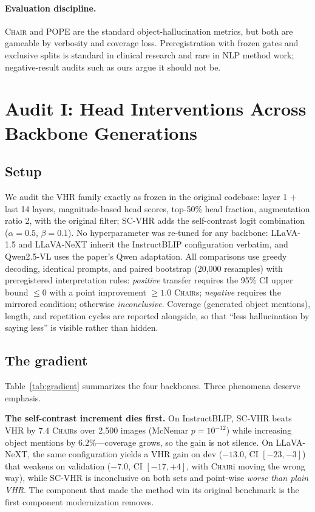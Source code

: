 \documentclass[11pt]{article}
\newcommand{\chair}{\textsc{Chair}}
\newcommand{\vhr}{VHR}
\newcommand{\scvhr}{SC-VHR}
\begin{document}
\paragraph{Evaluation discipline.}
\chair{} \citep{rohrbach2018chair} and POPE \citep{li2023pope} are the standard object-hallucination metrics, but both are gameable by verbosity and coverage loss. Preregistration with frozen gates and exclusive splits is standard in clinical research and rare in NLP method work; negative-result audits such as ours argue it should not be.

\section{Audit I: Head Interventions Across Backbone Generations}
\label{sec:audit1}

\subsection{Setup}
We audit the \vhr{} family exactly as frozen in the original codebase: layer 1 + last 14 layers, magnitude-based head scores, top-50\% head fraction, augmentation ratio 2, with the original filter; \scvhr{} adds the self-contrast logit combination ($\alpha{=}0.5$, $\beta{=}0.1$). No hyperparameter was re-tuned for any backbone: LLaVA-1.5 and LLaVA-NeXT inherit the InstructBLIP configuration verbatim, and Qwen2.5-VL uses the paper's Qwen adaptation. All comparisons use greedy decoding, identical prompts, and paired bootstrap (20{,}000 resamples) with preregistered interpretation rules: \emph{positive} transfer requires the 95\% CI upper bound $\le 0$ with a point improvement $\ge 1.0$ \chair{s}; \emph{negative} requires the mirrored condition; otherwise \emph{inconclusive}. Coverage (generated object mentions), length, and repetition cycles are reported alongside, so that ``less hallucination by saying less'' is visible rather than hidden.

\subsection{The gradient}
Table~\ref{tab:gradient} summarizes the four backbones. Three phenomena deserve emphasis.

\textbf{The self-contrast increment dies first.} On InstructBLIP, \scvhr{} beats \vhr{} by $7.4$ \chair{s} over 2{,}500 images (McNemar $p=10^{-12}$) while increasing object mentions by $6.2\%$---coverage grows, so the gain is not silence. On LLaVA-NeXT, the same configuration yields a \vhr{} gain on dev ($-13.0$, CI $[-23,-3]$) that weakens on validation ($-7.0$, CI $[-17,+4]$, with \chair{i} moving the wrong way), while \scvhr{} is inconclusive on both sets and point-wise \emph{worse than plain \vhr{}}. The component that made the method win its original benchmark is the first component modernization removes.
\end{document}
